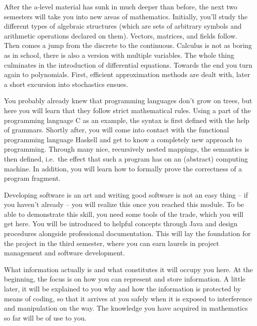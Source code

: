 
After the a-level material has sunk in much deeper than before, the next two semesters will take you into new areas of mathematics.
Initially, you'll study the different types of algebraic structures (which are sets of arbitrary symbols and arithmetic operations declared on them).
Vectors, matrices, and fields follow.
Then comes a jump from the discrete to the continuous.
Calculus is not as boring as in school, there is also a version with multiple variables.
The whole thing culminates in the introduction of differential equations.
Towards the end you turn again to polynomials.
First, efficient approximation methods are dealt with, later a short excursion into stochastics ensues.

You probably already knew that programming languages don't grow on trees, but here you will learn that they follow strict mathematical rules.
Using a part of the programming language C as an example, the syntax is first defined with the help of grammars.
Shortly after, you will come into contact with the functional programming language Haskell and get to know a completely new approach to programming.
Through many nice, recursively nested mappings, the semantics is then defined, i.e.\ the effect that such a program has on an (abstract) computing machine.
In addition, you will learn how to formally prove the correctness of a program fragment.

Developing software is an art and writing good software is not an easy thing -- if you haven't already -- you will realize this once you reached this module.
To be able to demonstrate this skill, you need some tools of the trade, which you will get here.
You will be introduced to helpful concepts through Java and design procedures alongside professional documentation.
This will lay the foundation for the project in the third semester, where you can earn laurels in project management and software development.


\newpage

What information actually is and what constitutes it will occupy you here.
At the beginning, the focus is on how you can represent and store information.
A little later, it will be explained to you why and how the information is protected by means of coding, so that it arrives at you safely when it is exposed to interference and manipulation on the way.
The knowledge you have acquired in mathematics so far will be of use to you.

